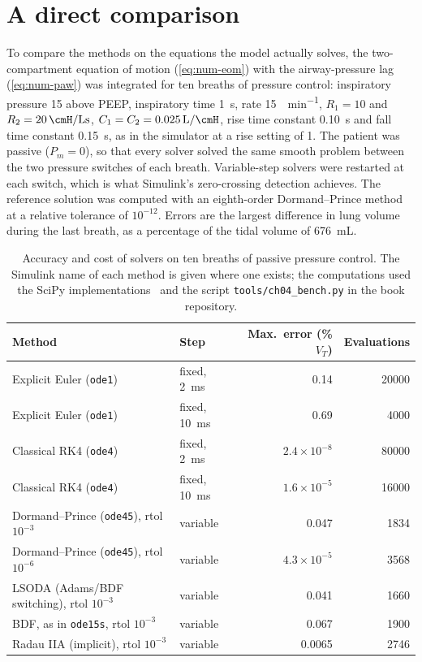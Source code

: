 \section{A direct comparison}
\label{sec:solv-bench}
To compare the methods on the equations the model actually solves, the two-compartment equation of motion (\cref{eq:num-eom}) with the airway-pressure lag (\cref{eq:num-paw}) was integrated for ten breaths of pressure control: inspiratory pressure \SI{15}{\cmH} above PEEP, inspiratory time \SI{1}{\second}, rate \SI{15}{\breath\per\minute}, $R_1 = 10$ and $R_2 = \SI{20}{\cmH\per\liter\second}$, $C_1 = C_2 = \SI{0.025}{\liter\per\cmH}$, rise time constant \SI{0.10}{\second} and fall time constant \SI{0.15}{\second}, as in the simulator at a rise setting of 1. The patient was passive ($P_m = 0$), so that every solver solved the same smooth problem between the two pressure switches of each breath. Variable-step solvers were restarted at each switch, which is what Simulink's zero-crossing detection achieves. The reference solution was computed with an eighth-order Dormand--Prince method at a relative tolerance of $10^{-12}$. Errors are the largest difference in lung volume during the last breath, as a percentage of the tidal volume of \SI{676}{\milli\liter}.

\begin{table}[ht]
\centering
\caption{Accuracy and cost of solvers on ten breaths of passive pressure control. The Simulink name of each method is given where one exists; the computations used the SciPy implementations~\citep{virtanen2020} and the script \texttt{tools/ch04\_bench.py} in the book repository.}
\label{tab:solv-bench}
\small
\begin{tabularx}{\linewidth}{@{}X l r r@{}}
\toprule
Method & Step & Max.\ error (\% $V_T$) & Evaluations \\
\midrule
Explicit Euler (\texttt{ode1}) & fixed, \SI{2}{\milli\second} & 0.14 & 20000 \\
Explicit Euler (\texttt{ode1}) & fixed, \SI{10}{\milli\second} & 0.69 & 4000 \\
Classical RK4 (\texttt{ode4}) & fixed, \SI{2}{\milli\second} & $2.4\times10^{-8}$ & 80000 \\
Classical RK4 (\texttt{ode4}) & fixed, \SI{10}{\milli\second} & $1.6\times10^{-5}$ & 16000 \\
Dormand--Prince (\texttt{ode45}), rtol $10^{-3}$ & variable & 0.047 & 1834 \\
Dormand--Prince (\texttt{ode45}), rtol $10^{-6}$ & variable & $4.3\times10^{-5}$ & 3568 \\
LSODA (Adams/BDF switching), rtol $10^{-3}$ & variable & 0.041 & 1660 \\
BDF, as in \texttt{ode15s}, rtol $10^{-3}$ & variable & 0.067 & 1900 \\
Radau IIA (implicit), rtol $10^{-3}$ & variable & 0.0065 & 2746 \\
\bottomrule
\end{tabularx}
\end{table}

